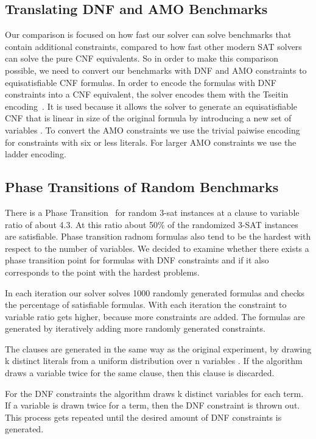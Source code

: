 \documentclass{easychair}
\begin{document}
\subsection{Translating DNF and AMO Benchmarks}

Our comparison is focused on how fast our solver can solve benchmarks that contain additional constraints, compared to how fast other modern SAT solvers can solve the pure CNF equivalents. So in order to make this comparison possible, we need to convert our benchmarks with DNF and AMO constraints to equisatisfiable CNF formulas.
In order to encode the formulas with DNF constraints into a CNF equivalent, the solver encodes them with the Tseitin encoding~\cite{tseitin1983complexity}. It is used because it allows the solver to generate an equisatisfiable CNF that is linear in size of the original formula by introducing a new set of variables \cite{biere2009handbook}.
To convert the AMO constraints we use the trivial paiwise encoding for constraints with six or less literals. For larger AMO constraints we use the ladder encoding.


\subsection{Phase Transitions of Random Benchmarks}

There is a Phase Transition~\cite{gent1994sat} for random 3-sat instances at a clause to variable ratio of about 4.3. At this ratio about 50\% of the randomized 3-SAT instances are satisfiable. Phase transition radnom formulas also tend to be the hardest with respect to the number of variables. We decided to examine whether there exists a phase transition point for formulas with DNF constraints and if it also corresponds to the point with the hardest problems.

In each iteration our solver solves 1000 randomly generated formulas and checks the percentage of satisfiable formulas. With each iteration the constraint to variable ratio gets higher, because more constraints are added. The formulas are generated by iteratively adding more randomly generated constraints.

The clauses are generated in the same way as the original experiment, by drawing k distinct literals from a uniform distribution over n variables \cite{gent1994sat}. If the algorithm draws a variable twice for the same clause, then this clause is discarded.

For the DNF constraints the algorithm draws k distinct variables for each term. If a variable is drawn twice for a term, then the DNF constraint is thrown out. This process gets repeated until the desired amount of DNF constraints is generated.
\end{document}
